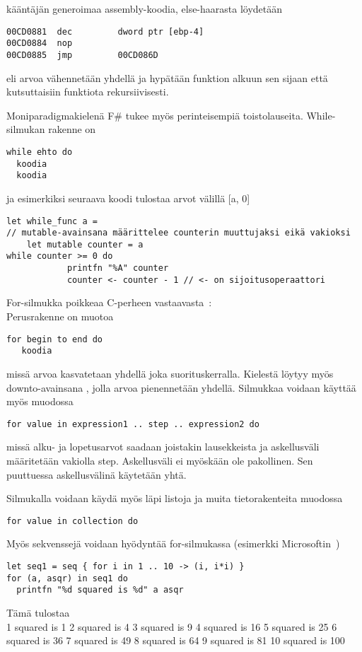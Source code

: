 kääntäjän generoimaa assembly-koodia, else-haarasta löydetään

\begin{lstlisting}
00CD0881  dec         dword ptr [ebp-4]  
00CD0884  nop  
00CD0885  jmp         00CD086D
\end{lstlisting}

eli arvoa vähennetään yhdellä ja hypätään funktion alkuun sen sijaan että kutsuttaisiin funktiota rekursiivisesti.
\par
Moniparadigmakielenä F\# tukee myös perinteisempiä toistolauseita. While-silmukan rakenne on

\begin{lstlisting}
while ehto do
  koodia
  koodia
\end{lstlisting}

ja esimerkiksi seuraava koodi tulostaa arvot välillä [a, 0]

\begin{lstlisting}
let while_func a =
// mutable-avainsana määrittelee counterin muuttujaksi eikä vakioksi
    let mutable counter = a     
while counter >= 0 do
            printfn "%A" counter
            counter <- counter - 1 // <- on sijoitusoperaattori
\end{lstlisting}

For-silmukka poikkeaa C-perheen vastaavasta~\cite{msn_loops}:
\\
Perusrakenne on muotoa

\begin{lstlisting}
for begin to end do  
   koodia
\end{lstlisting}

missä arvoa kasvatetaan yhdellä joka suorituskerralla. Kielestä löytyy myös downto-avainsana , jolla arvoa pienennetään yhdellä. Silmukkaa voidaan käyttää myös muodossa

\begin{lstlisting}
for value in expression1 .. step .. expression2 do
\end{lstlisting}

missä alku- ja lopetusarvot saadaan joistakin lausekkeista ja askellusväli määritetään vakiolla step. Askellusväli ei myöskään ole pakollinen. Sen puuttuessa askellusvälinä käytetään yhtä.
\par
Silmukalla voidaan käydä myös läpi listoja ja muita tietorakenteita muodossa

\begin{lstlisting}
for value in collection do
\end{lstlisting} 
 
Myös sekvenssejä voidaan hyödyntää for-silmukassa (esimerkki Microsoftin~\cite{msn_loops})

\begin{lstlisting}
let seq1 = seq { for i in 1 .. 10 -> (i, i*i) }
for (a, asqr) in seq1 do
  printfn "%d squared is %d" a asqr
\end{lstlisting}

Tämä tulostaa
\\
1 squared is 1
2 squared is 4
3 squared is 9
4 squared is 16
5 squared is 25
6 squared is 36
7 squared is 49
8 squared is 64
9 squared is 81
10 squared is 100  

